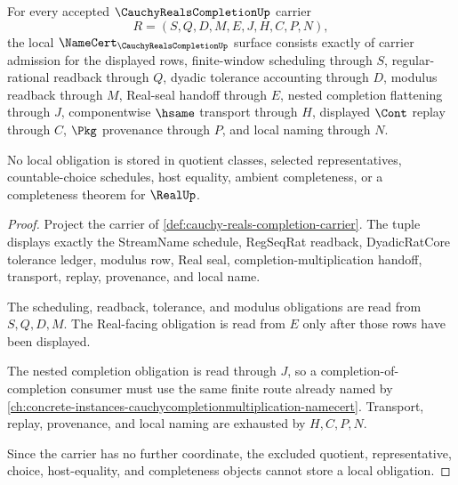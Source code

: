 \begin{theorem}
\label{thm:cauchy-reals-completion-namecert-obligations}
For every accepted $\CauchyRealsCompletionUp$ carrier
$$
R=(S,Q,D,M,E,J,H,C,P,N),
$$
the local $\NameCert_{\CauchyRealsCompletionUp}$ surface consists exactly of carrier admission for the displayed rows, finite-window scheduling through $S$, regular-rational readback through $Q$, dyadic tolerance accounting through $D$, modulus readback through $M$, Real-seal handoff through $E$, nested completion flattening through $J$, componentwise $\hsame$ transport through $H$, displayed $\Cont$ replay through $C$, $\Pkg$ provenance through $P$, and local naming through $N$.

No local obligation is stored in quotient classes, selected representatives, countable-choice schedules, host equality, ambient completeness, or a completeness theorem for $\RealUp$.
\end{theorem}
\begin{proof}
Project the carrier of \autoref{def:cauchy-reals-completion-carrier}. The tuple displays exactly the StreamName schedule, RegSeqRat readback, DyadicRatCore tolerance ledger, modulus row, Real seal, completion-multiplication handoff, transport, replay, provenance, and local name.

The scheduling, readback, tolerance, and modulus obligations are read from $S,Q,D,M$. The Real-facing obligation is read from $E$ only after those rows have been displayed.

The nested completion obligation is read through $J$, so a completion-of-completion consumer must use the same finite route already named by \autoref{ch:concrete-instances-cauchycompletionmultiplication-namecert}. Transport, replay, provenance, and local naming are exhausted by $H,C,P,N$.

Since the carrier has no further coordinate, the excluded quotient, representative, choice, host-equality, and completeness objects cannot store a local obligation.
\end{proof}

